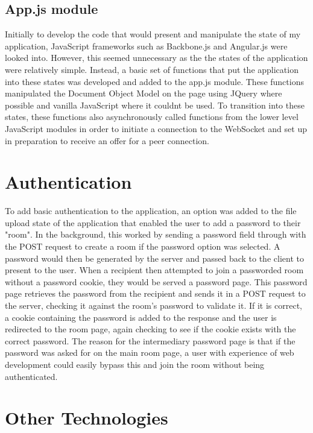 \documentclass[]{report}
\begin{document}
			\subsection{App.js module}
			Initially to develop the code that would present and manipulate the state of my application, JavaScript frameworks such as Backbone.js and Angular.js were looked into. However, this seemed unnecessary as the the states of the application were relatively simple. Instead, a basic set of functions that put the application into these states was developed and added to the app.js module. These functions manipulated the Document Object Model on the page using JQuery where possible and vanilla JavaScript where it couldnt be used. To transition into these states, these functions also asynchronously called functions from the lower level JavaScript modules in order to initiate a connection to the WebSocket and set up in preparation to receive an offer for a peer connection.
		
		\section{Authentication}
		To add basic authentication to the application, an option was added to the file upload state of the application that enabled the user to add a password to their "room". In the background, this worked by sending a password field through with the POST request to create a room if the password option was selected. A password would then be generated by the server and passed back to the client to present to the user. When a recipient then attempted to join a passworded room without a password cookie, they would be served a password page. This password page retrieves the password from the recipient and sends it in a POST request to the server, checking it against the room's password to validate it. If it is correct, a cookie containing the password is added to the response and the user is redirected to the room page, again checking to see if the cookie exists with the correct password. The reason for the intermediary password page is that if the password was asked for on the main room page, a user with experience of web development could easily bypass this and join the room without being authenticated.
		
		\section{Other Technologies}
\end{document}
